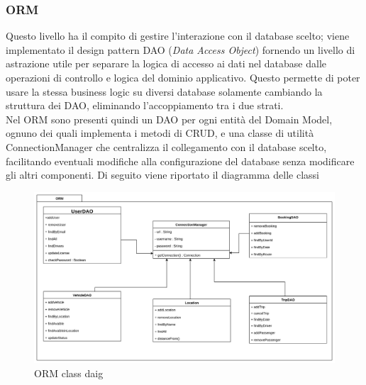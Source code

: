 \subsubsection{ORM}\label{subsec:ORM}
Questo livello ha il compito di gestire l'interazione con il database scelto; viene implementato il design pattern DAO (\textit{Data Access Object}) fornendo un livello di astrazione utile per separare la logica di accesso ai dati nel database dalle operazioni di controllo e logica del dominio applicativo.
Questo permette di poter usare la stessa business logic su diversi database solamente cambiando la struttura dei DAO, eliminando l'accoppiamento tra i due strati.\\
Nel ORM sono presenti quindi un DAO per ogni entità del Domain Model, ognuno dei quali implementa i metodi di CRUD, e una classe di utilità ConnectionManager che centralizza il collegamento con il database scelto, facilitando eventuali modifiche alla configurazione del database senza modificare gli altri componenti.
Di seguito viene riportato il diagramma delle classi
\begin{figure}[H]
    \centering
    \includegraphics[width=1\linewidth]{Images/ORM_diag.png}
    \caption{ORM class daig}
    \label{fig:ORMdiag}
\end{figure}
